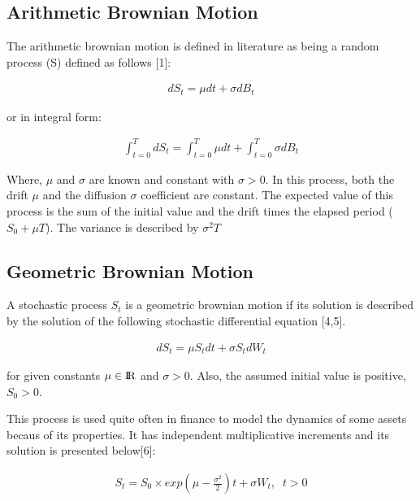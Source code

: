 \documentclass[12pt,twoside]{reedthesis}
\theoremstyle{definition}
\theoremstyle{definition}
\theoremstyle{remark}
\begin{document}
  \subsection{Arithmetic Brownian
  Motion}\label{arithmetic-brownian-motion}
  
  The arithmetic brownian motion is defined in literature as being a
  random process (S) defined as follows {[}1{]}:
  
  \begin{align}
  dS_t = \mu dt + \sigma dB_t
  \end{align}
  
  \begin{center}or in integral form:\end{center}
  
  \begin{align}
  \int_{t=0}^{T} dS_t = \int_{t=0}^{T}{\mu dt} + \int_{t=0}^{T}{\sigma dB_t}
  \end{align}
  
  \noindent
  Where, \(\mu\) and \(\sigma\) are known and constant with
  \(\sigma > 0\). In this process, both the drift \(\mu\) and the
  diffusion \(\sigma\) coefficient are constant. The expected value of
  this process is the sum of the initial value and the drift times the
  elapsed period (\(S_0 + \mu T\)). The variance is described by
  \(\sigma^2 T\)
  
  \subsection{Geometric Brownian Motion}\label{geometric-brownian-motion}
  
  A stochastic process \(S_t\) is a geometric brownian motion if its
  solution is described by the solution of the following stochastic
  differential equation {[}4,5{]}.
  
  \begin{align}
  dS_t = \mu S_t dt + \sigma S_t dW_t
  \end{align}
  
  \noindent
  for given constants \(\mu \in {\rm I\!R}\) and \(\sigma > 0\). Also, the
  assumed initial value is positive, \(S_0 >0\).
  
  This process is used quite often in finance to model the dynamics of
  some assets becaus of its properties. It has independent multiplicative
  increments and its solution is presented below{[}6{]}:
  
  \begin{align}
  S_t = S_0 \times exp{\left(\mu - \frac{\sigma^2}{2} \right) t + \sigma W_t}, \;\; t > 0
  \end{align}
  
\end{document}
